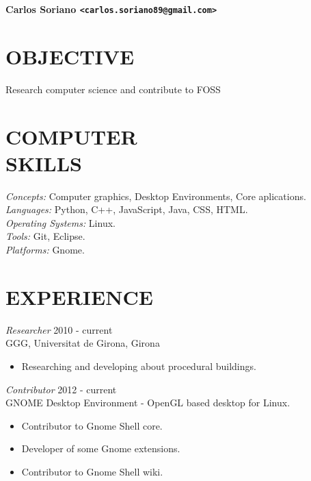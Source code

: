 \documentclass[margin]{}
\begin{document}
\moveleft\hoffset\vbox{\LARGE\bf Carlos Soriano \large\tt <carlos.soriano89@gmail.com>}

\begin{resume}
 
\section{\small OBJECTIVE}
                Research computer science and contribute to FOSS
 

\section{\small COMPUTER \\ SKILLS}
                {\sl Concepts:} Computer graphics, Desktop Environments, Core aplications. \\
                {\sl Languages:} Python, C++, JavaScript, Java, CSS, HTML. \\
                {\sl Operating Systems:} Linux. \\
                {\sl Tools:} Git, Eclipse. \\
                {\sl Platforms:} Gnome. \\
 
\section{\small EXPERIENCE} {\sl Researcher} \hfill 2010 - current \\
                GGG, Universitat de Girona, Girona
                \begin{itemize}  \itemsep -2pt
                \item Researching and developing about procedural buildings.
                \end{itemize}
                
                {\sl Contributor} \hfill 2012 - current \\
                GNOME Desktop Environment - OpenGL based desktop for Linux.
                \begin{itemize} \itemsep -2pt
                \item Contributor to Gnome Shell core.
                \item Developer of some Gnome extensions.
                \item Contributor to Gnome Shell wiki.
                \end{itemize}
                

\end{resume}
\end{document}
